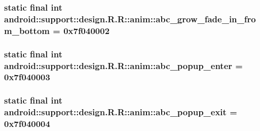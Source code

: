 \hypertarget{classandroid_1_1support_1_1design_1_1_r_1_1anim_389aa7137944983d1d91b16290cff12b}{
\subsubsection[{abc\_\-grow\_\-fade\_\-in\_\-from\_\-bottom}]{\setlength{\rightskip}{0pt plus 5cm}static final int android::support::design.R.R::anim::abc\_\-grow\_\-fade\_\-in\_\-from\_\-bottom = 0x7f040002}}
\label{classandroid_1_1support_1_1design_1_1_r_1_1anim_389aa7137944983d1d91b16290cff12b}


\hypertarget{classandroid_1_1support_1_1design_1_1_r_1_1anim_32f014f6367a5fe09bcaaed1f17c82f5}{
\subsubsection[{abc\_\-popup\_\-enter}]{\setlength{\rightskip}{0pt plus 5cm}static final int android::support::design.R.R::anim::abc\_\-popup\_\-enter = 0x7f040003}}
\label{classandroid_1_1support_1_1design_1_1_r_1_1anim_32f014f6367a5fe09bcaaed1f17c82f5}


\hypertarget{classandroid_1_1support_1_1design_1_1_r_1_1anim_1c9a8cef0e283df50be37f2a221c8e05}{
\subsubsection[{abc\_\-popup\_\-exit}]{\setlength{\rightskip}{0pt plus 5cm}static final int android::support::design.R.R::anim::abc\_\-popup\_\-exit = 0x7f040004}}
\label{classandroid_1_1support_1_1design_1_1_r_1_1anim_1c9a8cef0e283df50be37f2a221c8e05}



